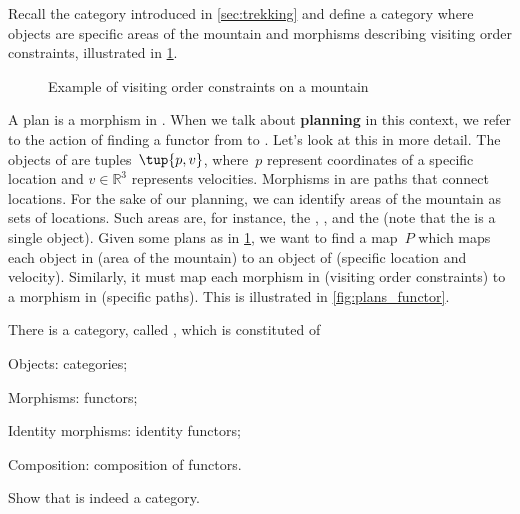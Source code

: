 \begin{example}
Recall the category \Berg introduced in \cref{sec:trekking} and define a category \Plans where objects are specific areas of the mountain and morphisms describing visiting order constraints, illustrated in \cref{fig:visiting_order_constraints}.



\begin{figure}[h]
\begin{center}
\end{center}
\caption{Example of visiting order constraints on a mountain}
\label{fig:visiting_order_constraints}
\end{figure}
A plan is a morphism in \Plans. When we talk about \textbf{planning} in this context, we refer to the action of finding a functor from \Plans to \Berg. Let's look at this in more detail. The objects of \Berg are tuples~$\tup{p,v}$, where~$p$ represent coordinates of a specific location and $v\in \mathbb{R}^3$ represents velocities. Morphisms in \Berg are paths that connect locations. For the sake of our planning, we can identify areas of the mountain as sets of locations. Such areas are, for instance, the , , and the  (note that the  is a single object). Given some plans as in \cref{fig:visiting_order_constraints}, we want to find a map~$P$ which maps each object in \Plans (area of the mountain) to an object of \Berg (specific location and velocity). Similarly, it must map each morphism in \Plans (visiting order constraints) to a morphism in \Berg (specific paths). This is illustrated in \cref{fig:plans_functor}.
\end{example}

\begin{exercise}
There is a category, called \Category, which is constituted of
\begin{compactitem}
\item Objects: categories;
\item Morphisms: functors;
\item Identity morphisms: identity functors;
\item Composition: composition of functors.
\end{compactitem}
Show that \Category is indeed a category.
\end{exercise}


